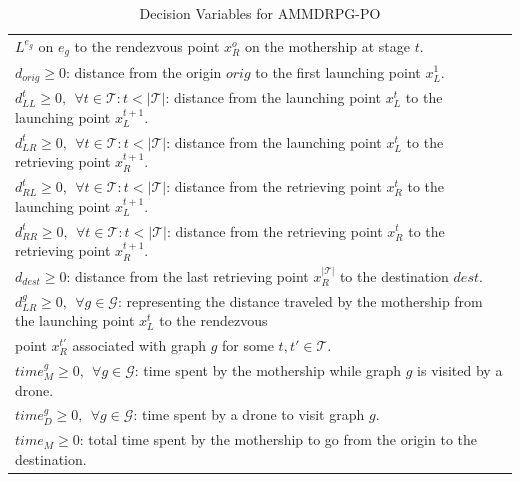 \documentclass[10pt,a4paper]{elsarticle}
\begin{document}
\begin{table}[h!]
\begin{tabular}{|l|}
\hspace*{1cm} $L^{e_g}$ on $e_g$ to the rendezvous point $x_R^o$ on the mothership at stage $t$.\\
$d_{orig}\geq 0$: distance from the origin $orig$ to the first launching point $x_L^1$.\\
$d_{LL}^t\geq 0, \:\: \forall t \in \mathcal T:t<|\mathcal T|$: distance from the launching point $x_L^t$ to the launching point $x_L^{t+1}$.\\
$d_{LR}^t\geq 0, \:\: \forall t \in \mathcal T:t<|\mathcal T|$: distance from the launching point $x_L^t$ to the retrieving point $x_R^{t+1}$.\\
$d_{RL}^t\geq 0, \:\: \forall t \in \mathcal T:t<|\mathcal T|$: distance from the retrieving point $x_R^t$ to the launching point $x_L^{t+1}$.\\
$d_{RR}^t\geq 0, \:\: \forall t \in \mathcal T:t<|\mathcal T|$: distance from the retrieving point $x_R^t$ to the retrieving point $x_R^{t+1}$.\\
$d_{dest}\geq 0$: distance from the last retrieving point $x_R^{|\mathcal T|}$ to the destination $dest$.\\
$d_{LR}^g\geq 0, \:\: \forall g \in\mathcal G$: representing the distance traveled by the mothership from the launching point $x_L^t$ to the rendezvous\\
\hspace*{1cm} point $x_R^{t'}$ associated with graph $g$ for some $t, t' \in \mathcal T$.\\

$time_M^g \geq 0, \:\: \forall g \in \mathcal G$: time spent by the mothership while graph $g$ is visited by a drone.\\
$time_D^g \geq 0, \:\: \forall g \in \mathcal G$: time spent by a drone to visit graph $g$.\\  
$time_M \geq 0$: total time spent by the mothership to go from the origin to the destination.\\
\hline
\end{tabular}
\caption{Decision Variables for AMMDRPG-PO}
\label{table:t3}
\end{table}
\end{document}
